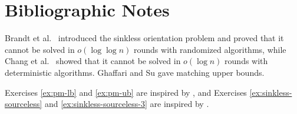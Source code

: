\section{Bibliographic Notes}

Brandt et al.\ \cite{brandt16lll} introduced the sinkless orientation problem and proved that it cannot be solved in $o(\log\log n)$ rounds with randomized algorithms, while Chang et al.\ \cite{chang16exponential} showed that it cannot be solved in $o(\log n)$ rounds with deterministic algorithms. Ghaffari and Su \cite{ghaffari17distributed} gave matching upper bounds.

Exercises \ref{ex:pm-lb} and \ref{ex:pm-ub} are inspired by \cite{balliu20binary-labeling}, and Exercises \ref{ex:sinkless-sourceless} and \ref{ex:sinkless-sourceless-3} are inspired by \cite{ghaffari19degree-splitting}.
